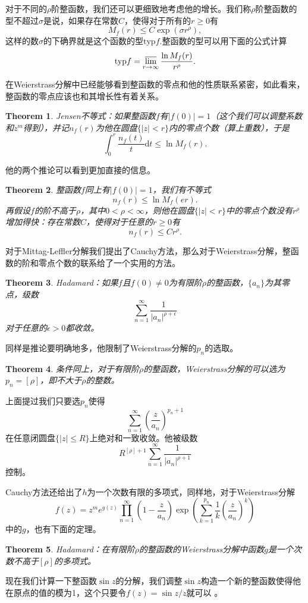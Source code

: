 \documentclass[10pt]{book}
\theoremstyle{plain}%
\newtheorem{theo}{Theorem}[chapter]%
\begin{document}
对于不同的$\rho$阶整函数，我们还可以更细致地考虑他的增长。我们称$\rho$阶整函数的型不超过$\sigma$是说，如果存在常数$C$，使得对于所有的$r\geq 0$有
\[
M_f(r)\leq C \exp(\sigma r^\rho ),
\]
这样的数$\sigma$的下确界就是这个函数的型$\mathrm{typ} f$.整函数的型可以用下面的公式计算
\[
\mathrm{typ} f =\varlimsup_{r\to \infty} \frac{\ln M_f(r)}{r^\rho}.
\]

在Weierstrass分解中已经能够看到整函数的零点和他的性质联系紧密，如此看来，整函数的零点应该也和其增长性有着关系。
\begin{theo}
Jensen不等式：如果整函数$f$有$|f(0)|=1$（这个我们可以调整系数和$z^m$得到），并记$n_f(r)$为他在圆盘$\{|z|<r\}$内的零点个数（算上重数），于是
\[
\int_{0}^r \frac{n_f(t)}{t}\mathrm{d}t \leq \ln M_f(r).
\]
\end{theo}
他的两个推论可以看到更加直接的信息。
\begin{theo}
整函数$f$同上有$|f(0)|=1$，我们有不等式
\[
n_f(r)\leq \ln M_f(er).
\]
再假设$f$的阶不高于$\rho$，其中$0<\rho<\infty$，则他在圆盘$\{|z|<r\}$中的零点个数没有$r^\rho$增加得快：存在常数$C$，使得对于任意的$r\geq 0$有
\[
n_f(r)\leq Cr^\rho.
\]
\end{theo}
对于Mittag-Leffler分解我们提出了Cauchy方法，那么对于Weierstrass分解，整函数的阶和零点个数的联系给了一个实用的方法。

\begin{theo}
Hadamard：如果$f$且$f(0)\neq 0$为有限阶$\rho$的整函数，$\{a_n\}$为其零点，级数
\[
\sum_{n=1}^\infty \frac{1}{|a_n|^{\rho+\epsilon}}
\]
对于任意的$\epsilon>0$都收敛。
\end{theo}
同样是推论要明确地多，他限制了Weierstrass分解的$p_n$的选取。
\begin{theo}
条件同上，对于有限阶$\rho$的整函数，Weierstrass分解的可以选为$p_n=[\rho]$，即不大于$\rho$的整数。
\end{theo}
上面提过我们只要选$p_n$使得
\[
\sum_{n=1}^\infty\left(\frac{z}{a_n}\right)^{p_n+1}
\]
在任意闭圆盘$\{|z|\leq R\}$上绝对和一致收敛。他被级数
\[
R^{[\rho]+1}\sum_{n=1}^\infty \frac{1}{|a_n|^{\rho+1}}
\]
控制。

Cauchy方法还给出了$h$为一个次数有限的多项式，同样地，对于Weierstrass分解
\[
f(z)=z^me^{g(z)}\prod_{n=1}^\infty  \left(1-\frac{z}{a_n}\right)\exp\left(\sum_{k=1}^{p_n}\frac{1}{k}\left(\frac{z}{a_n}\right)^k\right)
\]
中的$g$，也有下面的定理。
\begin{theo}
Hadamard：在有限阶$\rho$的整函数的Weierstrass分解中函数$g$是一个次数不高于$[\rho]$的多项式。
\end{theo}
现在我们计算一下整函数$\sin z$的分解，我们调整$\sin z$构造一个新的整函数使得他在原点的值的模为1，这个只要令$f(z)=\sin z /z$就可以 。
\end{document}
